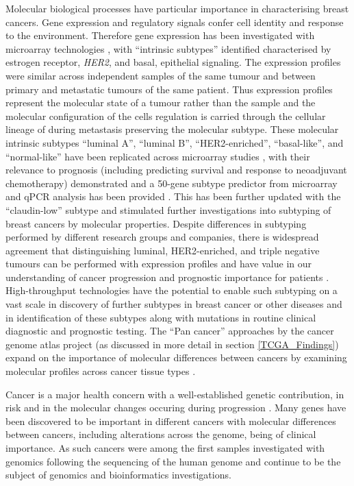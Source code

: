 Molecular biological processes have particular importance in characterising breast cancers. Gene expression and regulatory signals confer cell identity and response to the environment. Therefore gene expression has been investigated with microarray technologies \citet{Perou2000}, with ``intrinsic subtypes'' identified characterised by estrogen receptor, \textit{HER2}, and basal, epithelial signaling. The expression profiles were similar across independent samples of the same tumour and  between primary and metastatic tumours of the same patient. Thus expression profiles represent the molecular state of a tumour rather than the sample and the molecular configuration of the cells regulation is carried through the cellular lineage of during metastasis preserving the molecular subtype. These molecular intrinsic subtypes ``luminal A'', ``luminal B'', ``HER2-enriched'', ``basal-like'', and ``normal-like'' have been replicated across microarray studies \citep{Hu2006}, with their relevance to prognosis (including predicting survival and response to neoadjuvant chemotherapy) demonstrated and a 50-gene subtype predictor from microarray and qPCR analysis has been provided \citep{Sorlie2001, Parker2009}. This has been further updated with the ``claudin-low'' subtype \citep{Herschkowitz2007} and stimulated further investigations into subtyping of breast cancers by molecular properties. Despite differences in subtyping performed by different research groups and companies, there is widespread agreement that distinguishing luminal, HER2-enriched, and triple negative tumours can be performed with expression profiles and have value in our understanding of cancer progression and prognostic importance for patients \citet{Dai2015}. High-throughput technologies have the potential to enable such subtyping on a vast scale in discovery of further subtypes in breast cancer or other diseases and in identification of these subtypes along with mutations in routine clinical diagnostic and prognostic testing. The ``Pan cancer'' approaches by the cancer genome atlas project (as discussed in more detail in section \ref{TCGA_Findings}) expand on the importance of molecular differences between cancers by examining molecular profiles across cancer tissue types \citep{TCGA2013PAN}.

Cancer is a major health concern with a well-established genetic contribution, in risk and in the molecular changes occuring during progression \citep{Stratton2009}. Many genes have been discovered to be important in different cancers with molecular differences between cancers, including alterations across the genome, being of clinical importance. As such cancers were among the first samples investigated with genomics following the sequencing of the human genome \citet{Dickson1999} and continue to be the subject of genomics and bioinformatics investigations.

